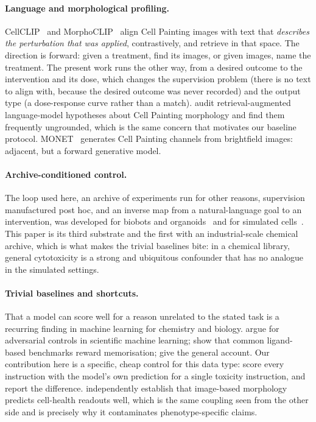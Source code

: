 \documentclass[11pt]{article}
\begin{document}
\paragraph{Language and morphological profiling.}
CellCLIP~\citep{lu2025cellclip} and MorphoCLIP~\citep{ilyosbekov2026morphoclip} align
Cell Painting images with text that \emph{describes the perturbation that was applied},
contrastively, and retrieve in that space. The direction is forward: given a treatment,
find its images, or given images, name the treatment. The present work runs the other
way, from a desired outcome to the intervention and its dose, which changes the
supervision problem (there is no text to align with, because the desired outcome was
never recorded) and the output type (a dose-response curve rather than a match).
\citet{park2026auditing} audit retrieval-augmented language-model hypotheses about
Cell Painting morphology and find them frequently ungrounded, which is the same concern
that motivates our baseline protocol. MONET~\citep{peysakhovich2025monet} generates Cell
Painting channels from brightfield images: adjacent, but a forward generative model.

\paragraph{Archive-conditioned control.}
The loop used here, an archive of experiments run for other reasons, supervision
manufactured post hoc, and an inverse map from a natural-language goal to an
intervention, was developed for biobots and organoids~\citep{le2026towardcontrolling}
and for simulated cells~\citep{le2025zapgpt,le2025voice}. This paper is its third
substrate and the first with an industrial-scale chemical archive, which is what makes
the trivial baselines bite: in a chemical library, general cytotoxicity is a strong and
ubiquitous confounder that has no analogue in the simulated settings.

\paragraph{Trivial baselines and shortcuts.}
That a model can score well for a reason unrelated to the stated task is a recurring
finding in machine learning for chemistry and biology.
\citet{chuang2018adversarial} argue for adversarial controls in scientific machine
learning; \citet{wallach2018memorization} show that common ligand-based benchmarks
reward memorisation; \citet{geirhos2020shortcut} give the general account. Our
contribution here is a specific, cheap control for this data type: score every
instruction with the model's own prediction for a single toxicity instruction, and
report the difference. \citet{way2021cellhealth} independently establish that
image-based morphology predicts cell-health readouts well, which is the same coupling
seen from the other side and is precisely why it contaminates phenotype-specific claims.
\end{document}
